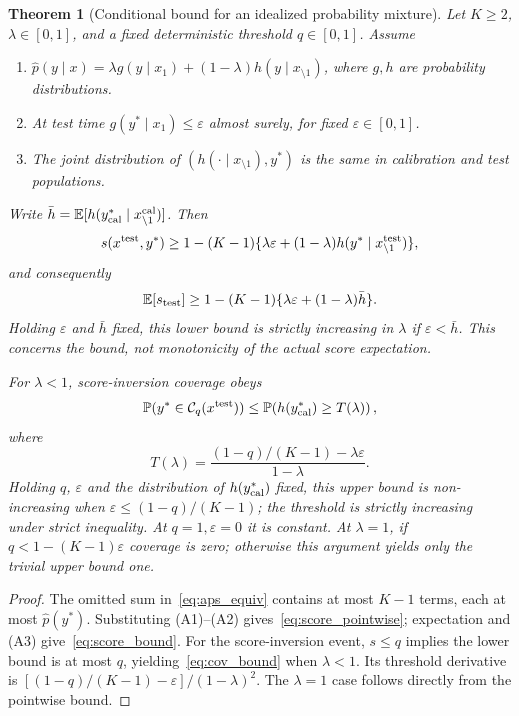 \documentclass[accepted]{uai2026} %
\newtheorem{theorem}{Theorem}
\begin{document}
\begin{theorem}[Conditional bound for an idealized probability mixture]\label{thm:score_inflation}
Let $K\geq2$, $\lambda\in[0,1]$, and a fixed deterministic threshold $q\in[0,1]$. Assume
\begin{enumerate}[label=\textup{(A\arabic*)},leftmargin=*,nosep]
\item $\hat p(y\mid x)=\lambda g(y\mid x_1)+(1-\lambda)h(y\mid x_{\setminus1})$, where $g,h$ are probability distributions.
\item At test time $g(y^*\mid x_1)\leq\varepsilon$ almost surely, for fixed $\varepsilon\in[0,1]$.
\item The joint distribution of $(h(\cdot\mid x_{\setminus1}),y^*)$ is the same in calibration and test populations.
\end{enumerate}
Write $\bar h=\mathbb E[h(y^*_{\rm cal}\mid x_{\setminus1}^{\rm cal})]$. Then
\begin{equation}\label{eq:score_pointwise}
s(x^{\rm test},y^*)\geq1-(K-1)\{\lambda\varepsilon+(1-\lambda)h(y^*\mid x_{\setminus1}^{\rm test})\},
\end{equation}
and consequently
\begin{equation}\label{eq:score_bound}
\mathbb E[s_{\rm test}]\geq1-(K-1)\{\lambda\varepsilon+(1-\lambda)\bar h\}.
\end{equation}
Holding $\varepsilon$ and $\bar h$ fixed, this lower bound is strictly increasing in $\lambda$ if $\varepsilon<\bar h$. This concerns the bound, not monotonicity of the actual score expectation.

For $\lambda<1$, score-inversion coverage obeys
\begin{equation}\label{eq:cov_bound}
\mathbb P(y^*\in\mathcal C_q(x^{\rm test}))\leq
\mathbb P\!\left(h(y^*_{\rm cal})\geq T(\lambda)\right),
\end{equation}
where
\[
T(\lambda)=\frac{(1-q)/(K-1)-\lambda\varepsilon}{1-\lambda}.
\]
Holding $q$, $\varepsilon$ and the distribution of $h(y^*_{\rm cal})$ fixed, this upper bound is non-increasing when $\varepsilon\leq(1-q)/(K-1)$; the threshold is strictly increasing under strict inequality. At $q=1,\varepsilon=0$ it is constant. At $\lambda=1$, if $q<1-(K-1)\varepsilon$ coverage is zero; otherwise this argument yields only the trivial upper bound one.
\end{theorem}

\begin{proof}
The omitted sum in~\eqref{eq:aps_equiv} contains at most $K-1$ terms, each at most $\hat p(y^*)$. Substituting (A1)--(A2) gives~\eqref{eq:score_pointwise}; expectation and (A3) give~\eqref{eq:score_bound}. For the score-inversion event, $s\leq q$ implies the lower bound is at most $q$, yielding~\eqref{eq:cov_bound} when $\lambda<1$. Its threshold derivative is $[(1-q)/(K-1)-\varepsilon]/(1-\lambda)^2$. The $\lambda=1$ case follows directly from the pointwise bound.
\end{proof}
\end{document}
